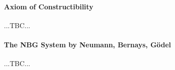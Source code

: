 \paragraph{Axiom of Constructibility} ...TBC...










\paragraph{The NBG System by Neumann, Bernays, Gödel} ...TBC...




